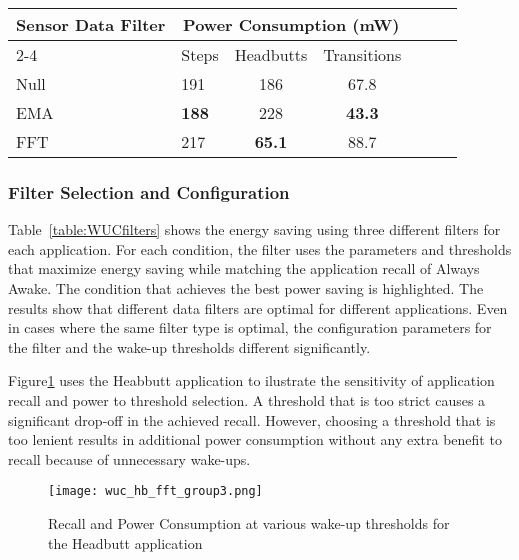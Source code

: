 \begin{table*}[t]
\centering
    \begin{tabular}{|l|l|c|c|c|c|c|}
	\hline
    \multirow{2}{*}{Sensor Data Filter}    	& \multicolumn{3}{c|}{Power Consumption (mW)} \\ \cline{2-4}
							& Steps	& Headbutts	& Transitions 	\\ \hline
    Null     				& 191		& 186		& 67.8 			\\ \hline
	EMA   				& {\bf 188}		& 228		& {\bf 43.3} 			\\ \hline
	FFT 				& 217		& {\bf 65.1} 		& 88.7 			\\ \hline
	
    \end{tabular}
	\caption{Average power for Group 2 runs with different filters.}
	\label{table:WUCfilters}
\end{table*}

\subsubsection{Filter Selection and Configuration}

Table~\ref{table:WUCfilters} shows the energy saving using three
different filters for each application.  For each condition, the
filter uses the parameters and thresholds that maximize energy saving
while matching the application recall of Always Awake.  The condition
that achieves the best power saving is highlighted.  The results show
that different data filters are optimal for different applications.
Even in cases where the same filter type is optimal, the configuration
parameters for the filter and the wake-up thresholds different
significantly.  

Figure\ref{fig:wucHeadbuttFFTRecallPowerGroup3} uses the Heabbutt
application to ilustrate the sensitivity of application recall and
power to threshold selection.  A threshold that is too strict causes a
significant drop-off in the achieved recall.  However, choosing a
threshold that is too lenient results in additional power consumption
without any extra benefit to recall because of unnecessary wake-ups.

\begin{figure}[h]
	\texttt{[image: wuc\_hb\_fft\_group3.png]}
	\caption{Recall and Power Consumption at various wake-up thresholds for the Headbutt application}
    \label{fig:wucHeadbuttFFTRecallPowerGroup3}
\end{figure}

